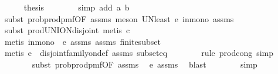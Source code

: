 \begin{isabellebody}
\ \ \ \ \isamarkupfalse%
\ {\isacharquery}{\kern0pt}thesis\isanewline
\ \ \ \ \ \ \isamarkupfalse%
\ {\isacharparenleft}{\kern0pt}simp\ add{\isacharcolon}{\kern0pt}\ a\ b{\isacharparenright}{\kern0pt}\isanewline
\ \ \ \ \ \ \isamarkupfalse%
\ {\isacharparenleft}{\kern0pt}subst\ prob{\isacharunderscore}{\kern0pt}prod{\isacharunderscore}{\kern0pt}pmf{\isacharprime}{\kern0pt}{\isacharbrackleft}{\kern0pt}OF\ assms{\isacharparenleft}{\kern0pt}{}{\isacharparenright}{\kern0pt}{\isacharbrackright}{\kern0pt}{\isacharcomma}{\kern0pt}\ meson\ UN{\isacharunderscore}{\kern0pt}least\ e\ in{\isacharunderscore}{\kern0pt}mono\ assms{\isacharparenleft}{\kern0pt}{}{\isacharparenright}{\kern0pt}{\isacharparenright}{\kern0pt}\isanewline
\ \ \ \ \ \ \isamarkupfalse%
\ {\isacharparenleft}{\kern0pt}subst\ prod{\isachardot}{\kern0pt}UNION{\isacharunderscore}{\kern0pt}disjoint{\isacharcomma}{\kern0pt}\ metis\ c{\isacharparenright}{\kern0pt}\isanewline
\ \ \ \ \ \ \ \ \isamarkupfalse%
\ {\isacharparenleft}{\kern0pt}metis\ in{\isacharunderscore}{\kern0pt}mono\ \ e\ assms{\isacharparenleft}{\kern0pt}{}{\isacharparenright}{\kern0pt}\ assms{\isacharparenleft}{\kern0pt}{}{\isacharparenright}{\kern0pt}\ finite{\isacharunderscore}{\kern0pt}subset{\isacharparenright}{\kern0pt}\isanewline
\ \ \ \ \ \ \ \isamarkupfalse%
\ {\isacharparenleft}{\kern0pt}metis\ e\ \ disjoint{\isacharunderscore}{\kern0pt}family{\isacharunderscore}{\kern0pt}on{\isacharunderscore}{\kern0pt}def\ assms{\isacharparenleft}{\kern0pt}{}{\isacharparenright}{\kern0pt}\ subset{\isacharunderscore}{\kern0pt}eq{\isacharparenright}{\kern0pt}\isanewline
\ \ \ \ \ \ \isamarkupfalse%
\ {\isacharparenleft}{\kern0pt}rule\ prod{\isachardot}{\kern0pt}cong{\isacharcomma}{\kern0pt}\ simp{\isacharparenright}{\kern0pt}\isanewline
\ \ \ \ \ \ \isamarkupfalse%
\ {\isacharparenleft}{\kern0pt}subst\ prob{\isacharunderscore}{\kern0pt}prod{\isacharunderscore}{\kern0pt}pmf{\isacharprime}{\kern0pt}{\isacharbrackleft}{\kern0pt}OF\ assms{\isacharparenleft}{\kern0pt}{}{\isacharparenright}{\kern0pt}{\isacharbrackright}{\kern0pt}{\isacharparenright}{\kern0pt}\ \isamarkupfalse%
\ e\ assms{\isacharparenleft}{\kern0pt}{}{\isacharparenright}{\kern0pt}\ \isamarkupfalse%
\ blast\isanewline
\ \ \ \ \ \ \isamarkupfalse%
\ simp\isanewline
\ \ \isamarkupfalse%
\isanewline

\end{isabellebody}
